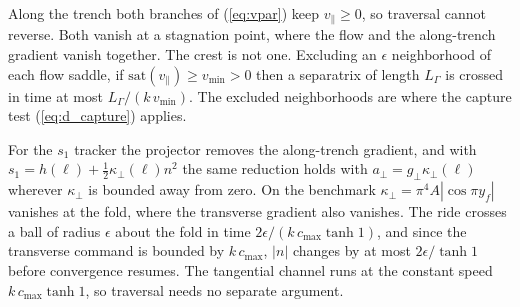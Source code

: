 \documentclass[lettersize,journal]{IEEEtran}
\begin{document}
Along the trench both branches of (\ref{eq:vpar}) keep
$v_\parallel \geq 0$, so traversal cannot reverse. Both vanish at a
stagnation point, where the flow and the along-trench gradient vanish
together. The crest is not one. Excluding an $\epsilon$ neighborhood of
each flow saddle, if $\mathrm{sat}(v_\parallel) \geq v_{\min} > 0$ then a
separatrix of length $L_\Gamma$ is crossed in time at most
$L_\Gamma/(k\,v_{\min})$. The excluded neighborhoods are where the
capture test (\ref{eq:d_capture}) applies.

For the $s_1$ tracker the projector removes the along-trench gradient,
and with $s_1 = h(\ell) + \tfrac{1}{2}\kappa_\perp(\ell)n^2$ the same
reduction holds with $a_\perp = g_\perp\kappa_\perp(\ell)$ wherever
$\kappa_\perp$ is bounded away from zero. On the benchmark
$\kappa_\perp = \pi^4 A|\cos \pi y_f|$ vanishes at the fold, where the
transverse gradient also vanishes. The ride crosses a ball of radius
$\epsilon$ about the fold in time $2\epsilon/(k\,c_{\max}\tanh 1)$, and
since the transverse command is bounded by $k\,c_{\max}$, $|n|$ changes
by at most $2\epsilon/\tanh 1$ before convergence resumes. The tangential
channel runs at the constant speed $k\,c_{\max}\tanh 1$, so traversal
needs no separate argument.
\end{document}
